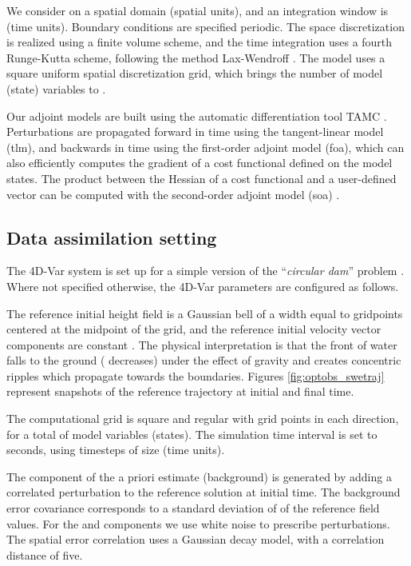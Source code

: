 \documentclass{article}
\begin{document}
We consider on a spatial domain  (spatial units), 
and an integration window is  (time units). 
Boundary conditions are specified periodic. The space discretization is realized using a finite volume scheme, 
and the time integration uses a fourth Runge-Kutta scheme, following the method Lax-Wendroff \cite{Wendroff_1998}.
The model uses a square  uniform spatial discretization grid, which brings the number of model (state) variables to .

Our adjoint models are built using the automatic differentiation tool TAMC \cite{giering1997tangent,TAMC}. 
Perturbations are propagated forward in time using the tangent-linear model ({\sc tlm}),
and backwards in time using the first-order adjoint model ({\sc foa}), which can also efficiently computes 
the gradient of a cost functional defined on the model states. 
The product between the Hessian of a cost functional and a user-defined vector can be computed with 
the second-order adjoint model ({\sc soa}) \cite{Cioaca_2011}. 



\subsection{Data assimilation setting}\label{sec:optobs_dasetup}


The 4D-Var system is set up for a simple version of the ``\textit{circular dam}'' problem \cite{anastasiou1997solution}.
Where not specified otherwise, the 4D-Var parameters are configured as follows.

The reference initial height field  is a Gaussian bell of a width equal to  gridpoints centered at the midpoint of the grid, 
and the reference initial velocity vector components are constant . 
The physical interpretation is that the front of water falls to the ground ( decreases) under the effect of gravity
and creates concentric ripples which propagate towards the boundaries. 
Figures \ref{fig:optobs_swetraj} represent snapshots of the reference trajectory at initial and final time. 

The computational grid is square and regular with  grid points in each direction, for a total of  model variables (states).
The simulation time interval is set to  seconds, using  timesteps of size  (time units).

The  component of the a priori estimate (background)  is generated by adding a correlated perturbation to the  reference solution at initial time.
The background error covariance  corresponds to a standard deviation of  of the reference field values.
For the  and  components we use white noise to prescribe perturbations.
The spatial error correlation uses a Gaussian decay model, with a correlation distance of five. 
\end{document}
